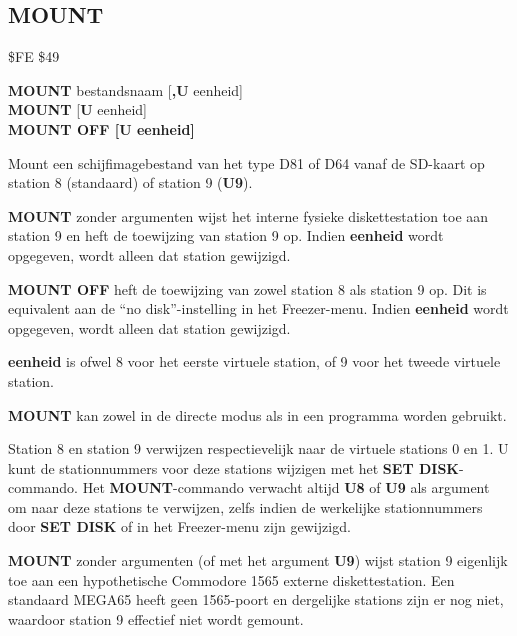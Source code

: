 \subsection{MOUNT}
\begin{description}[leftmargin=2cm,style=nextline]
\item [Token:]    \$FE \$49

\item [Formaat:]   {\bf MOUNT} bestandsnaam [{\bf,U} eenheid] \\                {\bf MOUNT} [{\bf U} eenheid] \\                  {\bf MOUNT OFF [{\bf U} eenheid]}

\item [Gebruik:]    Mount een schijfimagebestand van het type D81 of D64 vanaf de SD-kaart op station 8 (standaard) of station 9 ({\bf U9}).

                  {\bf MOUNT} zonder argumenten wijst het interne fysieke diskettestation toe aan station 9 en heft de toewijzing van station 9 op. Indien {\bf eenheid} wordt opgegeven, wordt alleen dat station gewijzigd.

                  {\bf MOUNT OFF} heft de toewijzing van zowel station 8 als station 9 op. Dit is equivalent aan de ``no disk''-instelling in het Freezer-menu. Indien {\bf eenheid} wordt opgegeven, wordt alleen dat station gewijzigd.

                  \filenamedefinition

                  {\bf eenheid} is ofwel 8 voor het eerste virtuele station, of 9 voor het tweede virtuele station.

\item [Opmerkingen:]  {\bf MOUNT} kan zowel in de directe modus als in een programma worden gebruikt.

                  Station 8 en station 9 verwijzen respectievelijk naar de virtuele stations 0 en 1. U kunt de stationnummers voor deze stations wijzigen met het {\bf SET DISK}-commando. Het {\bf MOUNT}-commando verwacht altijd {\bf U8} of {\bf U9} als argument om naar deze stations te verwijzen, zelfs indien de werkelijke stationnummers door {\bf SET DISK} of in het Freezer-menu zijn gewijzigd.

                  {\bf MOUNT} zonder argumenten (of met het argument {\bf U9}) wijst station 9 eigenlijk toe aan een hypothetische Commodore 1565 externe diskettestation. Een standaard MEGA65 heeft geen 1565-poort en dergelijke stations zijn er nog niet, waardoor station 9 effectief niet wordt gemount.


\end{description}
